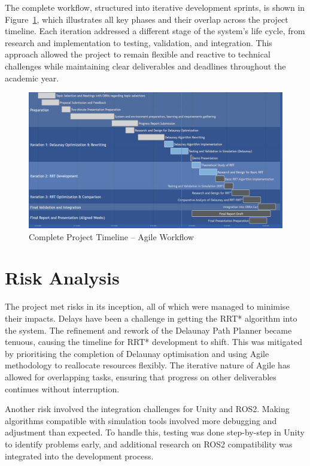 \documentclass[a4paper,11pt]{report}
\begin{document}
The complete workflow, structured into iterative development sprints, is shown in Figure~\ref{fig:agile_gantt}, which illustrates all 
key phases and their overlap across the project timeline. Each iteration addressed a different stage of the system's life cycle, 
from research and implementation to testing, validation, and integration. This approach allowed the project to remain flexible and 
reactive to technical challenges while maintaining clear deliverables and deadlines throughout the academic year.

\begin{figure}[H]
    \centering
    \includegraphics[width=1\textwidth]{Images/gant.png}
    \caption{Complete Project Timeline – Agile Workflow}
    \label{fig:agile_gantt}
\end{figure}

\section{Risk Analysis}
The project met risks in its inception, all of which were managed to minimise their impacts.
Delays have been a challenge in getting the RRT* algorithm into the system. The
refinement and rework of the Delaunay Path Planner became tenuous, causing the timeline for RRT* development to shift. 
This was mitigated by prioritising the completion of Delaunay optimisation and using 
Agile methodology to reallocate resources flexibly. The iterative nature of Agile has 
allowed for overlapping tasks, ensuring that progress on other deliverables continues 
without interruption.

Another risk involved the integration challenges for Unity and ROS2. Making algorithms
compatible with simulation tools involved more debugging and adjustment than
expected. To handle this, testing was done step-by-step in Unity to identify
problems early, and additional research on ROS2 compatibility was integrated into the development process.
\end{document}
